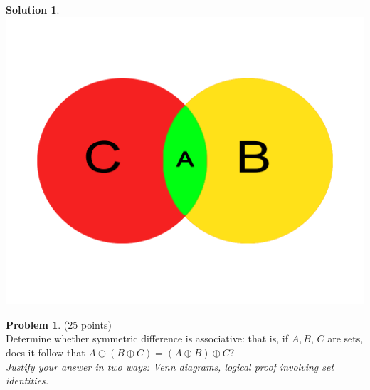 \documentclass{article}
\theoremstyle{definition}
\newtheorem{problem}{Problem}
\newtheorem*{solution}{Solution}
\begin{document}
\begin{solution}\ \\
\includegraphics[width=\textwidth,height=\textheight,keepaspectratio]{Venn1.png}
\end{solution}

\newpage

\begin{problem} (25 points)\\
Determine whether symmetric difference is associative: that is, if $A, B$, $C$ are sets, does it follow that $A\oplus(B\oplus C) = (A\oplus B) \oplus C$?\\
\textit{Justify your answer in two ways: Venn diagrams, logical proof involving set identities.}
\end{problem}
\end{document}
